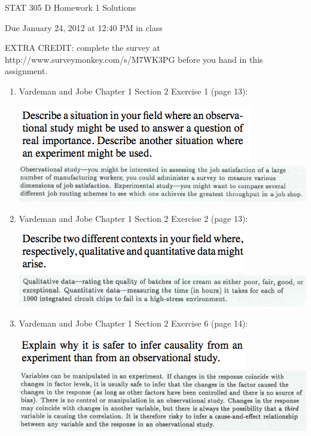 \documentclass{article}\usepackage{graphicx, color}
\numberwithin{equation}{section}
\begin{document}
\begin{flushleft}


\begin{center} \LARGE
STAT 305 D Homework 1 Solutions
\end{center}
\begin{center} \Large
Due January 24, 2012 at 12:40 PM in class
\end{center}

{\Large
\color{blue} EXTRA CREDIT: complete the survey at http://www.surveymonkey.com/s/M7WK3PG before you hand in this assignment.}



\begin{enumerate}[1. ]
 \setcounter{enumi}{0}

\item Vardeman and Jobe Chapter 1 Section 2 Exercise 1 (page 13):

 \includegraphics{../../fig/ch1s2p1.png}
 \includegraphics{../../fig/ch1s2p1sol.png}

\item Vardeman and Jobe Chapter 1 Section 2 Exercise 2 (page 13):

 \includegraphics{../../fig/ch1s2p2.png}
 \includegraphics{../../fig/ch1s2p2sol.png}

\item Vardeman and Jobe Chapter 1 Section 2 Exercise 6 (page 14):

 \includegraphics{../../fig/ch1s2p6.png}
 \includegraphics{../../fig/ch1s2p6sol.png}


\end{enumerate}
\end{flushleft}
\end{document}
